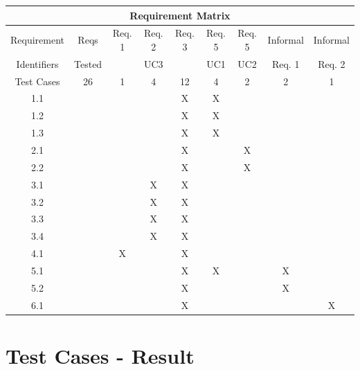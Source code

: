\documentclass[a4paper, 12pt]{article}
\begin{document}
\begin{tabular}{|c|c|c|c|c|c|c|c|c|}
\hline
\multicolumn{9}{|c|}{Requirement Matrix} \\ \hline
Requirement	& Reqs		& Req. 1	& 	Req. 2	&  Req. 3	& Req. 5 	& Req. 5	& Informal	& Informal	\\ 
Identifiers		& Tested	&				&	UC3		& 				&	UC1		& UC2		&	Req. 1	&	Req. 2	\\ \hline
Test Cases	&	26			&	1			&	4			&	12			&	4			&	2			&	2			&	1		\\ \hline
1.1				& 				&				&				&	X			&	X			&				&				&			\\ \hline
1.2				& 				&				&				&	X			&	X			&				&				&			\\ \hline
1.3 				& 				&				&				&	X			&	X			&				&				&			\\ \hline
2.1				&				& 				& 				&	X			&				&	X			&				&			\\ \hline
2.2				&				&				& 				&	X			&				&	X			&				&			\\ \hline
3.1				&				&				& X			&	X			&				&				&				&			\\ \hline
3.2				&				&				& X			&	X			&				&				&				&			\\ \hline
3.3				&				&				& X			&	X			&				&				&				&			\\ \hline
3.4				&				&				& X			&	X			&				&				&				&			\\ \hline
4.1				& 				&	X			& 				&	X			&				&				&				&			\\ \hline
5.1				&				&				&				&	X			&	X			&				&	X			&			\\ \hline
5.2				&				&				&				&	X			&				&				&	X			&			\\ \hline
6.1				&				&				&				&	X			&				&				&				&	X		\\ \hline

\end{tabular}



\section{Test Cases - Result}
\end{document}
